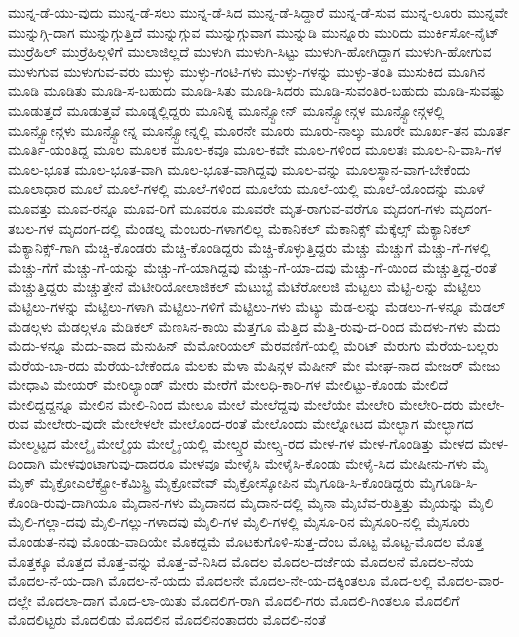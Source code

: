 {ಮುನ್ನ-ಡೆ-ಯು-ವುದು
ಮುನ್ನ-ಡೆ-ಸಲು
ಮುನ್ನ-ಡೆ-ಸಿದ
ಮುನ್ನ-ಡೆ-ಸಿದ್ದಾರೆ
ಮುನ್ನ-ಡೆ-ಸುವ
ಮುನ್ನ-ಲೂರು
ಮುನ್ನವೇ
ಮುನ್ನುಗ್ಗಿ-ದಾಗ
ಮುನ್ನುಗ್ಗುತ್ತಿದೆ
ಮುನ್ನುಗ್ಗುವ
ಮುನ್ನುಗ್ಗುವಾಗ
ಮುನ್ನುಡಿ
ಮುನ್ನೂರು
ಮುರಿದು
ಮುರ್ಕಿಸೋ-ನೈಟ್
ಮುರ್ರೆಹಿಲ್
ಮುರ್ರೆಹಿಲ್ಗಳಿಗೆ
ಮುಲಾಜಿಲ್ಲದೆ
ಮುಳುಗಿ
ಮುಳುಗಿ-ಸಿಟ್ಟು
ಮುಳುಗಿ-ಹೋಗಿದ್ದಾಗ
ಮುಳುಗಿ-ಹೋಗುವ
ಮುಳುಗುವ
ಮುಳುಗುವ-ವರು
ಮುಳ್ಳು
ಮುಳ್ಳು-ಗಂಟಿ-ಗಳು
ಮುಳ್ಳು-ಗಳನ್ನು
ಮುಳ್ಳು-ತಂತಿ
ಮುಸುಕಿದ
ಮೂಗಿನ
ಮೂಡಿ
ಮೂಡಿತು
ಮೂಡಿ-ಸ-ಬಹುದು
ಮೂಡಿ-ಸಿತು
ಮೂಡಿ-ಸಿದರು
ಮೂಡಿ-ಸುವಂತಿರ-ಬಹುದು
ಮೂಡಿ-ಸುವಷ್ಟು
ಮೂಡುತ್ತದೆ
ಮೂಡುತ್ತವೆ
ಮೂಡ್ನಲ್ಲಿದ್ದರು
ಮೂನಿಕ್ನ
ಮೂನ್ಸ್ಟೋನ್
ಮೂನ್ಸ್ಟೋನ್ಗಳ
ಮೂನ್ಸ್ಟೋನ್ಗಳಲ್ಲಿ
ಮೂನ್ಸ್ಟೋನ್ಗಳು
ಮೂನ್ಸ್ಟೋನ್ನ
ಮೂನ್ಸ್ಟೋನ್ನಲ್ಲಿ
ಮೂರನೇ
ಮೂರು
ಮೂರು-ನಾಲ್ಕು
ಮೂರೇ
ಮೂರ್ಖ-ತನ
ಮೂರ್ತ
ಮೂರ್ತಿ-ಯಂತಿದ್ದ
ಮೂಲ
ಮೂಲಕ
ಮೂಲ-ಕವೂ
ಮೂಲ-ಕವೇ
ಮೂಲ-ಗಳಿಂದ
ಮೂಲತಃ
ಮೂಲ-ನಿ-ವಾಸಿ-ಗಳ
ಮೂಲ-ಭೂತ
ಮೂಲ-ಭೂತ-ವಾಗಿ
ಮೂಲ-ಭೂತ-ವಾಗಿದ್ದವು
ಮೂಲ-ವನ್ನು
ಮೂಲಸ್ಥಾನ-ವಾಗ-ಬೇಕೆಂದು
ಮೂಲಾಧಾರ
ಮೂಲೆ
ಮೂಲೆ-ಗಳಲ್ಲಿ
ಮೂಲೆ-ಗಳಿಂದ
ಮೂಲೆಯ
ಮೂಲೆ-ಯಲ್ಲಿ
ಮೂಲೆ-ಯೊಂದನ್ನು
ಮೂಳೆ
ಮೂವತ್ತು
ಮೂವ-ರನ್ನೂ
ಮೂವ-ರಿಗೆ
ಮೂವರೂ
ಮೂವರೇ
ಮೃತ-ರಾಗುವ-ವರೆಗೂ
ಮೃದಂಗ-ಗಳು
ಮೃದಂಗ-ತಬಲ-ಗಳ
ಮೃದಂಗ-ದಲ್ಲಿ
ಮೆಂಡಲ್ನ
ಮೆಂಬರು-ಗಳಾಗಲಿಲ್ಲ
ಮೆಕಾನಿಕಲ್
ಮೆಕಾನಿಕ್ಸ್
ಮೆಕ್ಕೆಲ್ಸ್
ಮೆಕ್ಯಾನಿಕಲ್
ಮೆಕ್ಯಾನಿಕ್ಸ್-ಗಾಗಿ
ಮೆಚ್ಚಿ-ಕೊಂಡರು
ಮೆಚ್ಚಿ-ಕೊಂಡಿದ್ದರು
ಮೆಚ್ಚಿ-ಕೊಳ್ಳುತ್ತಿದ್ದರು
ಮೆಚ್ಚು
ಮೆಚ್ಚುಗೆ
ಮೆಚ್ಚು-ಗೆ-ಗಳಲ್ಲಿ
ಮೆಚ್ಚು-ಗೆಗೆ
ಮೆಚ್ಚು-ಗೆ-ಯನ್ನು
ಮೆಚ್ಚು-ಗೆ-ಯಾಗಿದ್ದವು
ಮೆಚ್ಚು-ಗೆ-ಯಾ-ದವು
ಮೆಚ್ಚು-ಗೆ-ಯಿಂದ
ಮೆಚ್ಚುತ್ತಿದ್ದ-ರಂತೆ
ಮೆಚ್ಚುತ್ತಿದ್ದರು
ಮೆಚ್ಚುತ್ತೇನೆ
ಮೆಟೀರಿಯೋಲಾಜಿಕಲ್
ಮೆಟುಬ್ಟೆ
ಮೆಟೆರೋಲಜಿ
ಮೆಟ್ಟಲು
ಮೆಟ್ಟಿ-ಲನ್ನು
ಮೆಟ್ಟಿಲು
ಮೆಟ್ಟಿಲು-ಗಳನ್ನು
ಮೆಟ್ಟಿಲು-ಗಳಾಗಿ
ಮೆಟ್ಟಿಲು-ಗಳಿಗೆ
ಮೆಟ್ಟಿಲು-ಗಳು
ಮೆಟ್ಯು
ಮೆಡ-ಲನ್ನು
ಮೆಡಲು-ಗ-ಳನ್ನೂ
ಮೆಡಲ್
ಮೆಡಲ್ಗಳು
ಮೆಡಲ್ಗಳೂ
ಮೆಡಿಕಲ್
ಮೆಣಸಿನ-ಕಾಯಿ
ಮೆತ್ತಗೂ
ಮೆತ್ತಿದ
ಮೆತ್ತಿ-ರುವು-ದ-ರಿಂದ
ಮೆದಳು-ಗಳು
ಮೆದು
ಮೆದು-ಳನ್ನೂ
ಮೆದು-ವಾದ
ಮೆನುಹಿನ್
ಮೆಮೋರಿಯಲ್
ಮೆರವಣಿಗೆ-ಯಲ್ಲಿ
ಮೆರಿಟ್
ಮೆರುಗು
ಮೆರೆಯ-ಬಲ್ಲರು
ಮೆರೆಯ-ಬಾ-ರದು
ಮೆರೆಯ-ಬೇಕೆಂದೂ
ಮೆಲಕು
ಮೆಳಾ
ಮೆಷಿನ್ಗಳ
ಮೆಷೀನ್
ಮೇ
ಮೇಘ-ನಾದ
ಮೇಜರ್
ಮೇಜು
ಮೇಧಾವಿ
ಮೇಯರ್
ಮೇರಿಲ್ಯಾಂಡ್
ಮೇರು
ಮೇರೆಗೆ
ಮೇಲಧಿ-ಕಾರಿ-ಗಳ
ಮೇಲಿಟ್ಟು-ಕೊಂಡು
ಮೇಲಿದೆ
ಮೇಲಿದ್ದದ್ದನ್ನೂ
ಮೇಲಿನ
ಮೇಲಿ-ನಿಂದ
ಮೇಲೂ
ಮೇಲೆ
ಮೇಲೆದ್ದವು
ಮೇಲೆಯೇ
ಮೇಲೇರಿ
ಮೇಲೇರಿ-ದರು
ಮೇಲೇ-ರುವ
ಮೇಲೇರು-ವುದೇ
ಮೇಲೇಳಲೇ
ಮೇಲೊಂದ-ರಂತೆ
ಮೇಲೊಂದು
ಮೇಲ್ನೋಟದ
ಮೇಲ್ಭಾಗ
ಮೇಲ್ಭಾಗದ
ಮೇಲ್ಮಟ್ಟದ
ಮೇಲ್ಮೈ
ಮೇಲ್ಮೈಯ
ಮೇಲ್ಮೈ-ಯಲ್ಲಿ
ಮೇಲ್ಸ್ತರ
ಮೇಲ್ಸ್ತ-ರದ
ಮೇಳ-ಗಳ
ಮೇಳ-ಗೊಂಡಿತ್ತು
ಮೇಳದ
ಮೇಳ-ದಿಂದಾಗಿ
ಮೇಳವುಂಟಾಗುವು-ದಾದರೂ
ಮೇಳವೂ
ಮೇಳೈಸಿ
ಮೇಳೈಸಿ-ಕೊಂಡು
ಮೇಳೈ-ಸಿದ
ಮೇಷೀನು-ಗಳು
ಮೈ
ಮೈಕ್
ಮೈಕ್ರೋಎಲೆಕ್ಟ್ರೋ-ಕೆಮಿಸ್ಟ್ರಿ
ಮೈಕ್ರೋವೇವ್
ಮೈಕ್ರೋಸ್ಕೋಪಿನ
ಮೈಗೂಡಿ-ಸಿ-ಕೊಂಡಿದ್ದರು
ಮೈಗೂಡಿ-ಸಿ-ಕೊಂಡಿ-ರುವು-ದಾಗಿಯೂ
ಮೈದಾನ-ಗಳು
ಮೈದಾನದ
ಮೈದಾನ-ದಲ್ಲಿ
ಮೈನಾ
ಮೈಬೆವ-ರುತ್ತಿತ್ತು
ಮೈಯನ್ನು
ಮೈಲಿ
ಮೈಲಿ-ಗಲ್ಲಾ-ದವು
ಮೈಲಿ-ಗಲ್ಲು-ಗಳಾದವು
ಮೈಲಿ-ಗಳ
ಮೈಲಿ-ಗಳಲ್ಲಿ
ಮೈಸೂ-ರಿನ
ಮೈಸೂರಿ-ನಲ್ಲಿ
ಮೈಸೂರು
ಮೊಂಡುತ-ನವು
ಮೊಂಡು-ವಾದಿಯೇ
ಮೊಕದ್ದಮೆ
ಮೊಟಕುಗೊಳಿ-ಸುತ್ತ-ದೆಂಬ
ಮೊಟ್ಟ
ಮೊಟ್ಟ-ಮೊದಲ
ಮೊತ್ತ
ಮೊತ್ತಕ್ಕೂ
ಮೊತ್ತದ
ಮೊತ್ತ-ವನ್ನು
ಮೊತ್ತ-ವೆ-ನಿಸಿದ
ಮೊದಲ
ಮೊದಲ-ದರ್ಜೆಯ
ಮೊದಲನೆ
ಮೊದಲ-ನೆಯ
ಮೊದಲ-ನೆ-ಯ-ದಾಗಿ
ಮೊದಲ-ನೆ-ಯದು
ಮೊದಲನೇ
ಮೊದಲ-ನೇ-ಯ-ದಕ್ಕಿಂತಲೂ
ಮೊದ-ಲಲ್ಲಿ
ಮೊದಲ-ವಾರ-ದಲ್ಲೇ
ಮೊದಲಾ-ದಾಗ
ಮೊದ-ಲಾ-ಯಿತು
ಮೊದಲಿಗ-ರಾಗಿ
ಮೊದಲಿ-ಗರು
ಮೊದಲಿ-ಗಿಂತಲೂ
ಮೊದಲಿಗೆ
ಮೊದಲಿಟ್ಟರು
ಮೊದಲಿಡು
ಮೊದಲಿನ
ಮೊದಲಿನಂತಾದರು
ಮೊದಲಿ-ನಂತೆ
}
